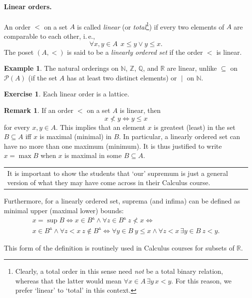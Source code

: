 \documentclass[12pt,notitlepage]{article}
\theoremstyle{plain}
\theoremstyle{definition}
\newtheorem{exc}[thm]{Exercise}
\newtheorem{exm}[thm]{Example}
\newtheorem{rem}[thm]{Remark}
\theoremstyle{plain}
\newcommand{\N}{\mathbb{N}}
\newcommand{\Z}{\mathbb{Z}}
\newcommand{\Q}{\mathbb{Q}}
\newcommand{\R}{\mathbb{R}}
\newcommand{\sbs}{\subseteq}
\newcommand{\mP}{\mathcal{P}}
\newcommand{\1}{\mathbf{1}}
\newcommand{\0}{\mathbf{0}}
\newcommand{\dvd}{\mathop{\mid}}
\newcommand{\mcomm}[1]{
\medskip\noindent\begin{tabular}{| l}
\parbox{0.99\textwidth}{{\small
#1 }}\end{tabular}
\smallskip}
\begin{document}
\paragraph{Linear orders.} An order ${<}$ on a set $A$ is called \emph{linear} (or \emph{total}\footnote{Clearly, a total order in this sense need \emph{not} be a total binary relation, whereas that the latter would mean $\forall x \in A\, \exists y\, x < y$. For this reason, we prefer `linear' to `total' in this context.}) if every two elements of $A$ are comparable to each other, i.\,e.,
$$\forall x, y \in A\ \ x \leq y \vee y \leq x.$$
The poset $(A,<)$ is said to be a \emph{linearly ordered set} if the order ${<}$ is linear.

\begin{exm}
The natural orderings on $\N$, $\Z$, $\Q$, and $\R$ are linear, unlike ${\sbs}$ on $\mP (A)$ (if the set $A$ has at least two distinct elements) or ${\dvd}$ on $\N$.
\end{exm}

\begin{exc}
Each linear order is a lattice.
\end{exc}

\begin{rem}
If an order ${<}$ on a set $A$ is linear, then
$$x \nless y \iff y \leq x$$
for every $x, y \in A$. This implies that an element $x$ is greatest (least) in the set $B \sbs A$ iff $x$ is maximal (minimal) in $B$. In particular, a linearly ordered set can have no more than one maximum (minimum). It is thus justified to write $x = \max B$ when $x$ is maximal in some $B \sbs A$.

\mcomm{It is important to show the students that `our' supremum is just a general version of what they may have come across in their Calculus course.}

Furthermore, for a linearly ordered set, suprema (and infima) can be defined as minimal upper (maximal lower) bounds:
\begin{multline*}
x = \sup B \iff  x \in B^\vartriangle \wedge \forall z \in B^\vartriangle\ z \nless x \iff\\
 x \in B^\vartriangle \wedge \forall z < x\ z \notin B^\vartriangle \iff
 \forall y\in B\ y \leq x \wedge \forall z < x\, \exists y \in B\ z < y.
\end{multline*}
\end{rem}
\noindent This form of the definition is routinely used in Calculus courses for subsets of $\R$.

\end{document}
